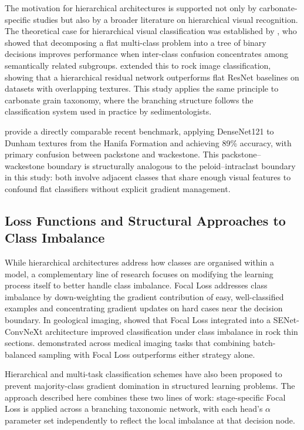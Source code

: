 \documentclass[a4paper,fleqn]{cas-dc}
\begin{document}
The motivation for hierarchical architectures is supported not only by carbonate-specific studies but also by a broader literature on hierarchical visual recognition. The theoretical case for hierarchical visual classification was established by \citet{yan2015hdcnn}, who showed that decomposing a flat multi-class problem into a tree of binary decisions improves performance when inter-class confusion concentrates among semantically related subgroups. \citet{zhang2024shn} extended this to rock image classification, showing that a hierarchical residual network outperforms flat ResNet baselines on datasets with overlapping textures. This study applies the same principle to carbonate grain taxonomy, where the branching structure follows the classification system used in practice by sedimentologists.

\citet{liudunham2023} provide a directly comparable recent benchmark, applying DenseNet121 to Dunham textures from the Hanifa Formation and achieving 89\% accuracy, with primary confusion between packstone and wackestone. This packstone--wackestone boundary is structurally analogous to the peloid--intraclast boundary in this study: both involve adjacent classes that share enough visual features to confound flat classifiers without explicit gradient management.

\subsection{Loss Functions and Structural Approaches to Class Imbalance}

While hierarchical architectures address how classes are organised within a model, a complementary line of research focuses on modifying the learning process itself to better handle class imbalance. Focal Loss \citep{lin2017focal} addresses class imbalance by down-weighting the gradient contribution of easy, well-classified examples and concentrating gradient updates on hard cases near the decision boundary. In geological imaging, \citet{dong2025} showed that Focal Loss integrated into a SENet-ConvNeXt architecture improved classification under class imbalance in rock thin sections. \citet{singh2023} demonstrated across medical imaging tasks that combining batch-balanced sampling with Focal Loss outperforms either strategy alone.

Hierarchical and multi-task classification schemes have also been proposed to prevent majority-class gradient domination in structured learning problems. The approach described here combines these two lines of work: stage-specific Focal Loss is applied across a branching taxonomic network, with each head's $\alpha$ parameter set independently to reflect the local imbalance at that decision node.
\end{document}
